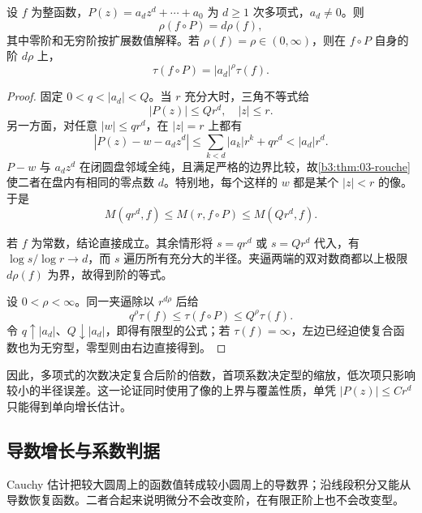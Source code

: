 \begin{proposition}[多项式复合的增长]\label{b3:prop:19-polynomial-composition}
设 \(f\) 为整函数，\(P(z)=a_dz^d+\cdots+a_0\) 为 \(d\ge1\) 次多项式，\(a_d\ne0\)。则
\[
 \rho(f\circ P)=d\rho(f),
\]
其中零阶和无穷阶按扩展数值解释。若 \(\rho(f)=\rho\in(0,\infty)\)，则在 \(f\circ P\) 自身的阶 \(d\rho\) 上，
\[
 \tau(f\circ P)=|a_d|^\rho\tau(f).
\]
\end{proposition}
\begin{proof}
固定 \(0<q<|a_d|<Q\)。当 \(r\) 充分大时，三角不等式给
\[
 |P(z)|\le Qr^d,\quad |z|\le r.
\]
另一方面，对任意 \(|w|\le q r^d\)，在 \(|z|=r\) 上都有
\[
 |P(z)-w-a_dz^d|
 \le\sum_{k<d}|a_k|r^k+q r^d
 <|a_d|r^d.
\]
\(P-w\) 与 \(a_dz^d\) 在闭圆盘邻域全纯，且满足严格的边界比较，故\cref{b3:thm:03-rouche}使二者在盘内有相同的零点数 \(d\)。特别地，每个这样的 \(w\) 都是某个 \(|z|<r\) 的像。于是
\[
 M(qr^d,f)\le M(r,f\circ P)\le M(Qr^d,f).
\]

若 \(f\) 为常数，结论直接成立。其余情形将 \(s=q r^d\) 或 \(s=Q r^d\) 代入，有 \(\log s/\log r\to d\)，而 \(s\) 遍历所有充分大的半径。夹逼两端的双对数商都以上极限 \(d\rho(f)\) 为界，故得到阶的等式。

设 \(0<\rho<\infty\)。同一夹逼除以 \(r^{d\rho}\) 后给
\[
 q^\rho\tau(f)\le\tau(f\circ P)\le Q^\rho\tau(f).
\]
令 \(q\uparrow|a_d|\)、\(Q\downarrow|a_d|\)，即得有限型的公式；若 \(\tau(f)=\infty\)，左边已经迫使复合函数也为无穷型，零型则由右边直接得到。
\end{proof}
因此，多项式的次数决定复合后阶的倍数，首项系数决定型的缩放，低次项只影响较小的半径误差。这一论证同时使用了像的上界与覆盖性质，单凭 \(|P(z)|\le C r^d\) 只能得到单向增长估计。

\subsection{导数增长与系数判据}
\label{b3:subsec:190204}

Cauchy 估计把较大圆周上的函数值转成较小圆周上的导数界；沿线段积分又能从导数恢复函数。二者合起来说明微分不会改变阶，在有限正阶上也不会改变型。

